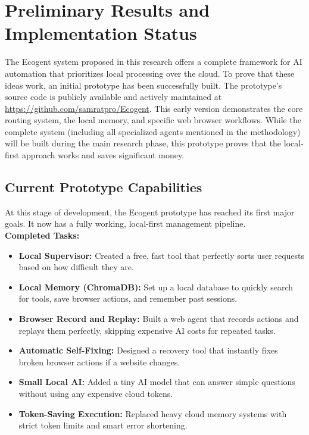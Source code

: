 \section{Preliminary Results and Implementation Status}
The Ecogent system proposed in this research offers a complete framework for AI automation that prioritizes local processing over the cloud. To prove that these ideas work, an initial prototype has been successfully built. The prototype's source code is publicly available and actively maintained at \url{https://github.com/samratpro/Ecogent}. This early version demonstrates the core routing system, the local memory, and specific web browser workflows. While the complete system (including all specialized agents mentioned in the methodology) will be built during the main research phase, this prototype proves that the local-first approach works and saves significant money.\\

\subsection*{Current Prototype Capabilities}
At this stage of development, the Ecogent prototype has reached its first major goals. It now has a fully working, local-first management pipeline.\\

\textbf{Completed Tasks:}
\begin{itemize}
    \item \textbf{Local Supervisor:} Created a free, fast tool that perfectly sorts user requests based on how difficult they are.
    \item \textbf{Local Memory (ChromaDB):} Set up a local database to quickly search for tools, save browser actions, and remember past sessions.
    \item \textbf{Browser Record and Replay:} Built a web agent that records actions and replays them perfectly, skipping expensive AI costs for repeated tasks.
    \item \textbf{Automatic Self-Fixing:} Designed a recovery tool that instantly fixes broken browser actions if a website changes.
    \item \textbf{Small Local AI:} Added a tiny AI model that can answer simple questions without using any expensive cloud tokens.
    \item \textbf{Token-Saving Execution:} Replaced heavy cloud memory systems with strict token limits and smart error shortening.
\end{itemize}

